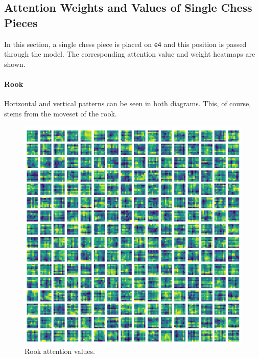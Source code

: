 \subsection{Attention Weights and Values of Single Chess Pieces}\label{mlS32}

In this section, a single chess piece is placed on \texttt{e4} and this
position is passed through the model. The corresponding attention value and
weight heatmaps are shown.

\paragraph{Rook} Horizontal and vertical patterns can be seen in both diagrams.
This, of course, stems from the moveset of the rook.

\begin{figure}[H]
  \begin{minipage}{0.475\textwidth}
    \centering
    \includegraphics[width=\textwidth]{project/img/attention_maps/R_attention_1.png}
    \caption{Rook attention values.}
    \label{atnR1}
  \end{minipage}
  \hspace{0.05\textwidth}
  \begin{minipage}{0.475\textwidth}
    \centering

\end{minipage}
\end{figure}
